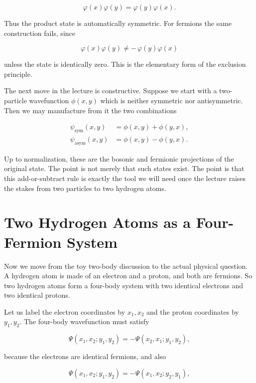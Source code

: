 \begin{equation}
\varphi(x)\varphi(y)=\varphi(y)\varphi(x).
\end{equation}

Thus the product state is automatically symmetric. For fermions the same construction fails, since

\begin{equation}
\varphi(x)\varphi(y)\neq -\,\varphi(y)\varphi(x)
\end{equation}

unless the state is identically zero. This is the elementary form of the exclusion principle.

The next move in the lecture is constructive. Suppose we start with a two-particle wavefunction \(\phi(x,y)\) which is neither symmetric nor antisymmetric. Then we may manufacture from it the two combinations

\begin{align}
\psi_{\mathrm{sym}}(x,y) &= \phi(x,y)+\phi(y,x),\\
\psi_{\mathrm{asym}}(x,y) &= \phi(x,y)-\phi(y,x).
\end{align}

Up to normalization, these are the bosonic and fermionic projections of the original state. The point is not merely that such states exist. The point is that this add-or-subtract rule is exactly the tool we will need once the lecture raises the stakes from two particles to two hydrogen atoms.

\section{Two Hydrogen Atoms as a Four-Fermion System}

Now we move from the toy two-body discussion to the actual physical question. A hydrogen atom is made of an electron and a proton, and both are fermions. So two hydrogen atoms form a four-body system with two identical electrons and two identical protons.

Let us label the electron coordinates by \(x_1,x_2\) and the proton coordinates by \(y_1,y_2\). The four-body wavefunction must satisfy

\begin{equation}
\Psi(x_1,x_2;y_1,y_2)=-\Psi(x_2,x_1;y_1,y_2),
\end{equation}

because the electrons are identical fermions, and also

\begin{equation}
\Psi(x_1,x_2;y_1,y_2)=-\Psi(x_1,x_2;y_2,y_1),
\end{equation}

